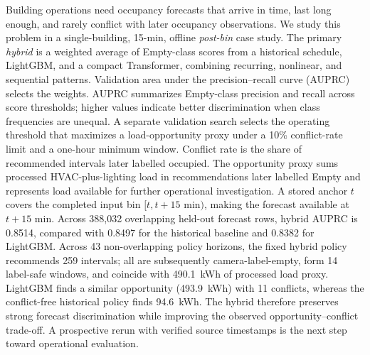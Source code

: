 Building operations need occupancy forecasts that arrive in time, last long enough, and rarely conflict with later occupancy observations. We study this problem in a single-building, 15-min, offline \emph{post-bin} case study. The primary \emph{hybrid} is a weighted average of Empty-class scores from a historical schedule, LightGBM, and a compact Transformer, combining recurring, nonlinear, and sequential patterns. Validation area under the precision--recall curve (AUPRC) selects the weights. AUPRC summarizes Empty-class precision and recall across score thresholds; higher values indicate better discrimination when class frequencies are unequal. A separate validation search selects the operating threshold that maximizes a load-opportunity proxy under a 10\% conflict-rate limit and a one-hour minimum window. Conflict rate is the share of recommended intervals later labelled occupied. The opportunity proxy sums processed HVAC-plus-lighting load in recommendations later labelled Empty and represents load available for further operational investigation. A stored anchor $t$ covers the completed input bin $[t,t+15\text{ min})$, making the forecast available at $t+15$ min. Across 388,032 overlapping held-out forecast rows, hybrid AUPRC is 0.8514, compared with 0.8497 for the historical baseline and 0.8382 for LightGBM. Across 43 non-overlapping policy horizons, the fixed hybrid policy recommends 259 intervals; all are subsequently camera-label-empty, form 14 label-safe windows, and coincide with 490.1~kWh of processed load proxy. LightGBM finds a similar opportunity (493.9~kWh) with 11 conflicts, whereas the conflict-free historical policy finds 94.6~kWh. The hybrid therefore preserves strong forecast discrimination while improving the observed opportunity--conflict trade-off. A prospective rerun with verified source timestamps is the next step toward operational evaluation.
